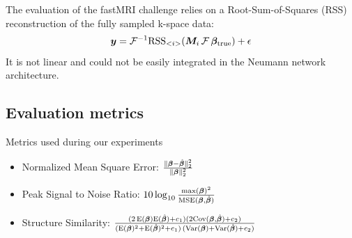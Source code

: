 \documentclass{article}
\begin{document}
The evaluation of the fastMRI challenge relies on a Root-Sum-of-Squares (RSS) reconstruction of the fully sampled k-space data:
$$
	\bm{y}	= \mathcal{F}^{-1} \text{RSS}_{<i>} (\bm{M}_i \, \mathcal{F} \, \bm{\beta}_{\text{true}}) + \epsilon			
$$
It is not linear and could not be easily integrated in the Neumann network architecture.
 
\subsection{Evaluation metrics}
Metrics used during our experiments
\begin{itemize}
	\item Normalized Mean Square Error: $\frac{ \| \bm{\beta} - \hat{\bm{\beta}} \|_2^2 } { \|  \bm{\beta} \|_2^2 }$
	\item Peak Signal to Noise Ratio: $10 \log_{10} \frac {\max({\bm{\beta}})^2 } {\mathrm{MSE} (\bm{\beta}, \hat{\bm{\beta}})}$
	\item Structure Similarity: $\frac{ ( 2 \, \mathrm{E}(\bm{\beta})  \mathrm{E}( \hat{\bm{\beta}}) + c_1) (2 \mathrm{Cov}(\bm{\beta},  \hat{\bm{\beta}}) + c_2) } { (\mathrm{E}(\bm{\beta})^2 +  \mathrm{E}( \hat{\bm{\beta}})^2 + c_1) \, (\mathrm{Var}(\bm{\beta}) +  \mathrm{Var}( \hat{\bm{\beta}}) + c_2) }$
\end{itemize}
\newpage
\end{document}
